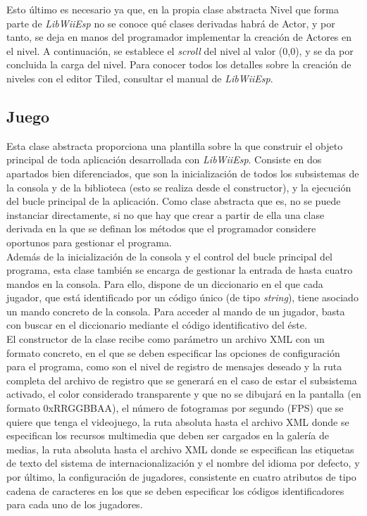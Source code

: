 Esto último es necesario ya que, en la propia clase abstracta Nivel que forma parte de \emph{LibWiiEsp} no se conoce qué clases derivadas habrá de Actor, y por tanto, se deja en manos del programador implementar la creación de Actores en el nivel. A continuación, se establece el \emph{scroll} del nivel al valor (0,0), y se da por concluida la carga del nivel. Para conocer todos los detalles sobre la creación de niveles con el editor Tiled, consultar el manual de \emph{LibWiiEsp}.

\subsection{Juego}

Esta clase abstracta proporciona una plantilla sobre la que construir el objeto principal de toda aplicación desarrollada con \emph{LibWiiEsp}. Consiste en dos apartados bien diferenciados, que son la inicialización de todos los subsistemas de la consola y de la biblioteca (esto se realiza desde el constructor), y la ejecución del bucle principal de la aplicación. Como clase abstracta que es, no se puede instanciar directamente, si no que hay que crear a partir de ella una clase derivada en la que se definan los métodos que el programador considere oportunos para gestionar el programa.\\

Además de la inicialización de la consola y el control del bucle principal del programa, esta clase también se encarga de gestionar la entrada de hasta cuatro mandos en la consola. Para ello, dispone de un diccionario en el que cada jugador, que está identificado por un código único (de tipo \emph{string}), tiene asociado un mando concreto de la consola. Para acceder al mando de un jugador, basta con buscar en el diccionario mediante el código identificativo del éste.\\

El constructor de la clase recibe como parámetro un archivo XML con un formato concreto, en el que se deben especificar las opciones de configuración para el programa, como son el nivel de registro de mensajes deseado y la ruta completa del archivo de registro que se generará en el caso de estar el subsistema activado, el color considerado transparente y que no se dibujará en la pantalla (en formato 0xRRGGBBAA), el número de fotogramas por segundo (FPS) que se quiere que tenga el videojuego, la ruta absoluta hasta el archivo XML donde se especifican los recursos multimedia que deben ser cargados en la galería de medias, la ruta absoluta hasta el archivo XML donde se especifican las etiquetas de texto del sistema de internacionalización y el nombre del idioma por defecto, y por último, la configuración de jugadores, consistente en cuatro atributos de tipo cadena de caracteres en los que se deben especificar los códigos identificadores para cada uno de los jugadores.\\

